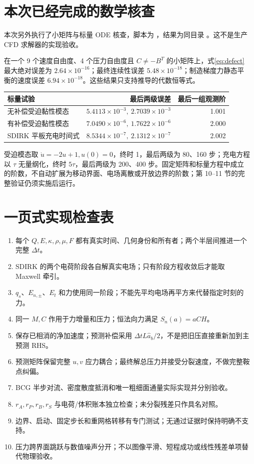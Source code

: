 \documentclass[UTF8,a4paper,11pt,fontset=fandol]{ctexart}
\numberwithin{equation}{section}
\newcommand{\dt}{\Delta t}\newcommand{\dd}{\,\mathrm d}
\begin{document}
\endgroup
\clearpage
\section{本次已经完成的数学核查}
本次另外执行了小矩阵与标量 ODE 核查，脚本为
，结果为同目录
。这不是生产 CFD 求解器的实现验收。

在一个 9 个速度自由度、4 个压力自由度且 $C\ne-B^T$ 的小矩阵上，式\eqref{eq:defect}最大绝对误差为 $2.64\times10^{-16}$；最终连续性误差 $5.48\times10^{-18}$；制造梯度力静态平衡的速度误差 $6.94\times10^{-18}$。这些结果只支持推导的代数恒等式。

\begin{center}
\begin{tabular}{@{}lrr@{}}
\toprule 标量试验 & 最后两级误差 & 最后一组观测阶\\\midrule
无补偿受迫黏性模态 & $5.4113\times10^{-3},\ 2.7039\times10^{-3}$ & 1.001\\
有补偿受迫黏性模态 & $7.0490\times10^{-6},\ 1.7622\times10^{-6}$ & 2.000\\
SDIRK 平板充电时间式 & $8.5344\times10^{-7},\ 2.1312\times10^{-7}$ & 2.002\\\bottomrule
\end{tabular}
\end{center}
受迫模态取 $\dot u=-2u+1,u(0)=0$，终时 1，最后两级为 80、160 步；充电方程以 $\tau$ 无量纲化，终时 $5\tau$，最后两级为 200、400 步。固定矩阵和标量方程中成立的阶数，不自动扩展为移动界面、电场离散或开放边界的阶数；第 10--11 节的完整验证仍须实施后运行。

\section{一页式实现检查表}
\begin{enumerate}
\item 每个 $Q,E,\kappa,\rho,\mu,F$ 都有真实时间、几何身份和所有者；两个半层间推进一个完整 $\dt$。
\item SDIRK 的两个电荷阶段各自解真实电场；只有阶段方程收敛后才能取 Maxwell 牵引。
\item $q_s$、$E_{n,\pm}$、$E_t$ 和力使用同一阶段；不能先平均电场再平方来代替指定时刻的力。
\item 同一 $M,C$ 作用于力增量和压力；恒法向力满足 $S_n(a)=aCH$。
\item 保存已相消的净加速度；预测补偿采用 $\dt L\widehat a_b/2$，不是把旧压直接重新加到主预测 RHS。
\item 预测矩阵保留完整 $u,v$ 应力耦合；最终解总压力并接受分裂速度，不做完整鞍点纠偏。
\item BCG 半步对流、密度散度抵消和唯一粗细面通量实际实现并分别验收。
\item $r_A,r_P,r_B,r_S$ 与电荷/体积账本独立检查；未分裂残差只作具名对照。
\item 边界、启动、固定步长和重网格转移有专门测试；无通过证据时保持明确不支持。
\item 压力跨界面跳跃与数值噪声分开；不以图像平滑、短程成功或线性残差单项替代物理验收。
\end{enumerate}
\end{document}
